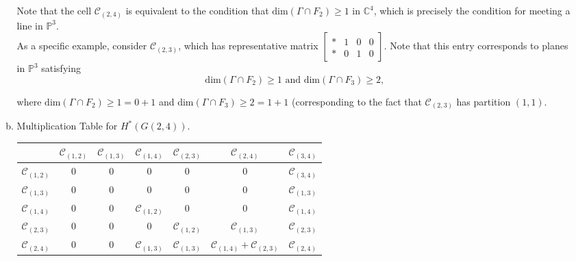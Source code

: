 \begin{itemize}
\begin{enumerate}[a)]
        Note that the cell $\mathcal{C}_{(2, 4)}$ is equivalent to the condition that $\mathrm{dim}(\Gamma \cap F_2) \geq 1$ in $\mathbb{C}^4$, which is precisely the condition for meeting a line in $\mathbb{P}^3$. \\

        As a specific example, consider $\mathcal{C}_{(2, 3)}$, which has representative matrix $\begin{bmatrix}
        \ast & 1 & 0 & 0 \\
        \ast & 0 & 1 & 0
        \end{bmatrix}$. Note that this entry corresponds to planes in $\mathbb{P}^3$ satisfying 
        \[
            \mathrm{dim} (\Gamma \cap F_2) \geq 1 \text{ and } \mathrm{dim} (\Gamma \cap F_3) \geq 2, 
        \] 

        where $\mathrm{dim} (\Gamma \cap F_2) \geq 1 = 0 + 1$ and $\mathrm{dim} (\Gamma \cap F_3) \geq 2 = 1 + 1$ (corresponding to the fact that $\mathcal{C}_{(2, 3)}$ has partition $(1, 1)$. 
        
        \item Multiplication Table for $H^*(G(2, 4))$. \\

        \begin{center}
        \begin{tabular}{c | c | c | c | c | c | c}
            & $\mathcal{C}_{(1, 2)}$ & $\mathcal{C}_{(1, 3)}$ & $\mathcal{C}_{(1, 4)}$ & $\mathcal{C}_{(2, 3)}$ & $\mathcal{C}_{(2, 4)}$ & $\mathcal{C}_{(3, 4)}$ \\ \hline
            
            $\mathcal{C}_{(1, 2)}$ & 0 & 0 & 0 & 0 & 0 & $\mathcal{C}_{(3, 4)}$ \\ \hline

            $\mathcal{C}_{(1, 3)}$ & 0 & 0 & 0 & 0 & 0 & $\mathcal{C}_{(1, 3)}$ \\ \hline
            
            $\mathcal{C}_{(1, 4)}$ & 0 & 0 & $\mathcal{C}_{(1, 2)}$ & 0 & 0 & $\mathcal{C}_{(1, 4)}$ \\ \hline

            $\mathcal{C}_{(2, 3)}$ & 0 & 0 & 0 & $\mathcal{C}_{(1, 2)}$ & $\mathcal{C}_{(1, 3)}$ & $\mathcal{C}_{(2, 3)}$ \\ \hline
            
            $\mathcal{C}_{(2, 4)}$ & 0 & 0 & $\mathcal{C}_{(1, 3)}$ & $\mathcal{C}_{(1, 3)}$ & $\mathcal{C}_{(1, 4)} +\mathcal{C}_{(2, 3)}$ & $\mathcal{C}_{(2, 4)}$ \\ \hline


\end{tabular}
\end{center}
\end{enumerate}
\end{itemize}

